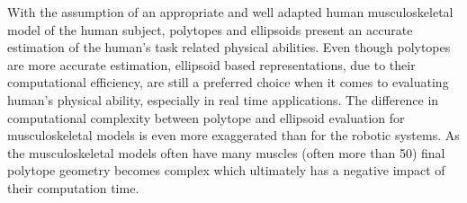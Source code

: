 With the assumption of an appropriate and well adapted human musculoskeletal model of the human subject, polytopes and ellipsoids present an accurate estimation of the human's task related physical abilities. 
Even though polytopes are more accurate estimation, ellipsoid based representations, due to their computational efficiency, are still a preferred choice when it comes to evaluating human's physical ability, especially in real time applications. The difference in computational complexity between polytope and ellipsoid evaluation for musculoskeletal models is even more exaggerated than for the robotic systems. As the musculoskeletal models often have many muscles (often more than 50) final polytope geometry becomes complex which ultimately has a negative impact of their computation time.

